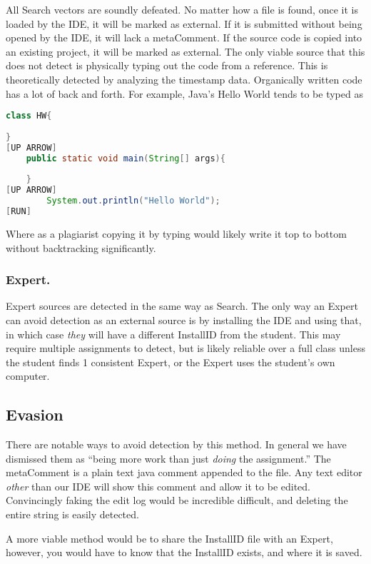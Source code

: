 \documentclass[10pt]{article}
\newcommand{\installID}{InstallID\xspace}
\newcommand{\metaComment}{metaComment\xspace}
\begin{document}
		All Search vectors are soundly defeated.  No matter how a file is found, once it is loaded by the IDE, it will be marked as external. If it is submitted without being opened by the IDE, it will lack a \metaComment.  If the source code is copied into an existing project, it will be marked as external.  The only viable source that this does not detect is physically typing out the code from a reference.  This is theoretically detected by analyzing the timestamp data.  Organically written code has a lot of back and forth.  For example, Java's Hello World tends to be typed as 
\begin{minipage}{\textwidth}
\begin{lstlisting}[language=Java]
class HW{
		
}
[UP ARROW]
	public static void main(String[] args){
	
	}
[UP ARROW]
		System.out.println("Hello World");
[RUN]
\end{lstlisting}
\end{minipage}
Where as a plagiarist copying it by typing would likely write it top to bottom without backtracking significantly.
	\subsubsection{Expert.\hspace{0.5em}\phantom{}} 
	
	Expert sources are detected in the same way as Search.  The only way an Expert can avoid detection as an external source is by installing the IDE and using that, in which case \textit{they} will have a different \installID from the student.  This may require multiple assignments to detect, but is likely reliable over a full class unless the student finds 1 consistent Expert, or the Expert uses the student's own computer.
\subsection{Evasion}

There are notable ways to avoid detection by this method.  In general we have dismissed them as ``being more work than just \textit{doing} the assignment.''  The \metaComment is a plain text java comment appended to the file.  Any text editor \textit{other} than our IDE will show this comment and allow it to be edited.  Convincingly faking the edit log would be incredible difficult, and deleting the entire string is easily detected.
            
A more viable method would be to share the \installID file with an Expert, however, you would have to know that the \installID exists, and where it is saved.
\end{document}
